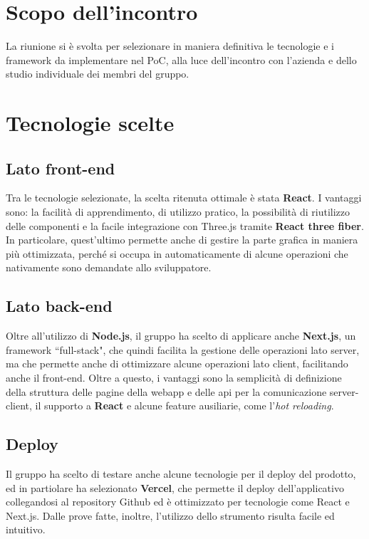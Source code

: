 \section{Scopo dell'incontro} \label{sec:argomenti}
La riunione si è svolta per selezionare in maniera definitiva le tecnologie e i framework da implementare nel PoC, alla luce dell'incontro con l'azienda e dello studio individuale dei membri del gruppo.

\section{Tecnologie scelte}
\subsection{Lato front-end}
Tra le tecnologie selezionate, la scelta ritenuta ottimale è stata \textbf{React}. I vantaggi sono: la facilità di apprendimento, di utilizzo pratico, la possibilità di riutilizzo delle componenti e la facile integrazione con Three.js tramite \textbf{React three fiber}. In particolare, quest'ultimo permette anche di gestire la parte grafica in maniera più ottimizzata, perché si occupa in automaticamente di alcune operazioni che nativamente sono demandate allo sviluppatore.
\subsection{Lato back-end}
Oltre all'utilizzo di \textbf{Node.js}, il gruppo ha scelto di applicare anche \textbf{Next.js}, un framework ``full-stack", che quindi facilita la gestione delle operazioni lato server, ma che permette anche di ottimizzare alcune operazioni lato client, facilitando anche il front-end. Oltre a questo, i vantaggi sono la semplicità di definizione della struttura delle pagine della webapp e delle api per la comunicazione server-client, il supporto a \textbf{React} e alcune feature ausiliarie, come l'\textit{hot reloading}.
\subsection{Deploy}
Il gruppo ha scelto di testare anche alcune tecnologie per il deploy del prodotto, ed in partiolare ha selezionato \textbf{Vercel}, che permette il deploy dell'applicativo collegandosi al repository Github ed è ottimizzato per tecnologie come React e Next.js. Dalle prove fatte, inoltre, l'utilizzo dello strumento risulta facile ed intuitivo.